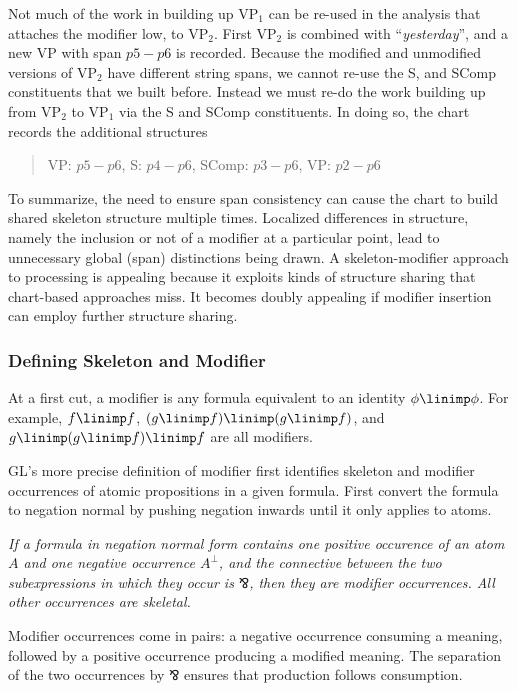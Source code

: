 Not much of the work in building up VP$_1$ can be re-used in the
analysis that attaches the modifier low, to VP$_2$.
  First VP$_2$ is combined with ``{\em yesterday}'', and a new
VP with span $p5-p6$ is recorded.  Because the modified and
unmodified versions of VP$_2$ have different string spans, we cannot
re-use the S, and SComp constituents that we built before.  Instead we
must re-do the work building up from VP$_2$ to VP$_1$ via the S and
SComp constituents.  In doing so, the chart records the additional
structures
\begin{quote}
VP: $p5-p6$, \hspace*{1.5em} S: $p4-p6$,\hspace*{1.5em} SComp: $p3-p6$,
\hspace*{1.5em} VP: $p2-p6$
\end{quote}
To summarize, the need to ensure
span consistency can cause the chart to build  shared
skeleton structure multiple times. Localized differences in
structure, namely the inclusion or not of a modifier at a particular
point, lead to unnecessary global (span) distinctions being drawn.
A skeleton-modifier approach to processing is
appealing because  it exploits  kinds of structure
sharing that chart-based approaches miss.  It becomes doubly
appealing if  modifier insertion can employ further structure sharing.

\subsubsection{Defining Skeleton and Modifier}

At a first cut, a modifier is any formula equivalent to
an identity $\phi\linimp\phi$.  For example, $f\linimp f$, 
$(g\linimp f)\linimp(g\linimp f)$, and $g\linimp (g\linimp f)\linimp f$
are all modifiers.  

GL's more precise definition of modifier first identifies
skeleton and modifier occurrences of atomic propositions in a given
formula.  First convert the formula to negation normal by
pushing negation inwards until it only applies to atoms.

{\it If a formula in negation normal form contains one positive
occurence of an atom $A$ and one negative occurrence $A^{\bot}$, and
the connective between the two subexpressions in which they occur is
$\invamp$, then they are modifier occurrences.  All other occurrences
are skeletal.}


\smallskip\noindent
Modifier occurrences come in pairs: a negative occurrence consuming a 
meaning, followed by a positive occurrence producing a modified
meaning.  The separation of the two occurrences by $\invamp$ ensures
that production follows consumption.

